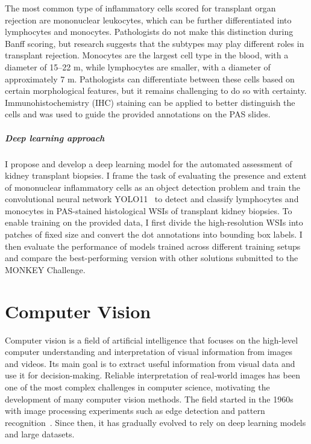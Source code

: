 The most common type of inflammatory cells scored for transplant organ rejection are mononuclear leukocytes, which can be further differentiated into lymphocytes and monocytes. Pathologists do not make this distinction during Banff scoring, but research suggests that the subtypes may play different roles in transplant rejection. Monocytes are the largest cell type in the blood, with a diameter of 15--22 \textmu m, while lymphocytes are smaller, with a diameter of approximately 7 \textmu m. Pathologists can differentiate between these cells based on certain morphological features, but it remains challenging to do so with certainty. Immunohistochemistry (IHC) staining can be applied to better distinguish the cells and was used to guide the provided annotations on the PAS slides.

\paragraph{Deep learning approach} I propose and develop a deep learning model for the automated assessment of kidney transplant biopsies. I frame the task of evaluating the presence and extent of mononuclear inflammatory cells as an object detection problem and train the convolutional neural network YOLO11~\cite{Jocher2024} to detect and classify lymphocytes and monocytes in PAS-stained histological WSIs of transplant kidney biopsies. To enable training on the provided data, I first divide the high-resolution WSIs into patches of fixed size and convert the dot annotations into bounding box labels. I then evaluate the performance of models trained across different training setups and compare the best-performing version with other solutions submitted to the MONKEY Challenge.



\chapter{Computer Vision}
Computer vision is a field of artificial intelligence that focuses on the high-level computer understanding and interpretation of visual information from images and videos. Its main goal is to extract useful information from visual data and use it for decision-making. Reliable interpretation of real-world images has been one of the most complex challenges in computer science, motivating the development of many computer vision methods. The field started in the 1960s with image processing experiments such as edge detection and pattern recognition~\cite{Shapiro2020}. Since then, it has gradually evolved to rely on deep learning models and large datasets.

